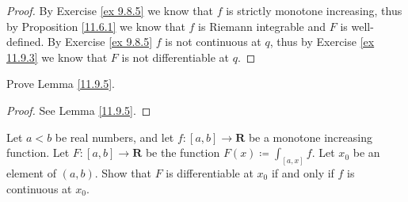 \begin{proof}
    By Exercise \ref{ex 9.8.5} we know that \(f\) is strictly monotone increasing, thus by Proposition \ref{11.6.1} we know that \(f\) is Riemann integrable and \(F\) is well-defined.
    By Exercise \ref{ex 9.8.5} \(f\) is not continuous at \(q\), thus by Exercise \ref{ex 11.9.3} we know that \(F\) is not differentiable at \(q\).
\end{proof}

\begin{exercise}\label{ex 11.9.2}
    Prove Lemma \ref{11.9.5}.
\end{exercise}

\begin{proof}
    See Lemma \ref{11.9.5}.
\end{proof}

\begin{exercise}\label{ex 11.9.3}
    Let \(a < b\) be real numbers, and let \(f : [a, b] \to \mathbf{R}\) be a monotone increasing function.
    Let \(F : [a, b] \to \mathbf{R}\) be the function \(F(x) \coloneqq \int_{[a, x]} f\).
    Let \(x_0\) be an element of \((a, b)\).
    Show that \(F\) is differentiable at \(x_0\) if and only if \(f\) is continuous at \(x_0\).
\end{exercise}

